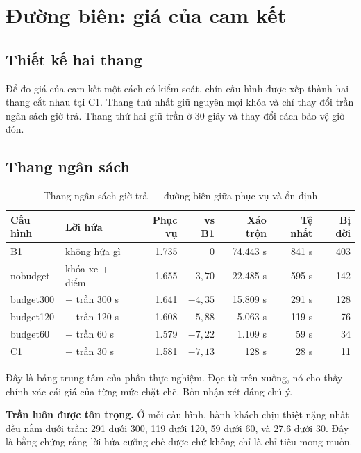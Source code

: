 \section{Đường biên: giá của cam kết}
\label{muc:duongbien}

\subsection{Thiết kế hai thang}

Để đo giá của cam kết một cách có kiểm soát, chín cấu hình được xếp thành hai thang cắt nhau
tại C1. Thang thứ nhất giữ nguyên mọi khóa và chỉ thay đổi trần ngân sách giờ trả. Thang thứ
hai giữ trần ở 30 giây và thay đổi cách bảo vệ giờ đón.

\subsection{Thang ngân sách}

\begin{table}[htbp]
\centering
\caption{Thang ngân sách giờ trả --- đường biên giữa phục vụ và ổn định}
\label{bang:thang1}
\small
\begin{tabular}{@{}llrrrrr@{}}
\toprule
\textbf{Cấu hình} & \textbf{Lời hứa} & \textbf{Phục vụ} & \textbf{vs B1} & \textbf{Xáo trộn} & \textbf{Tệ nhất} & \textbf{Bị dời}\\
\midrule
B1 & không hứa gì & 1.735 & 0 & 74.443 s & 841 s & 403\\
nobudget & khóa xe + điểm & 1.655 & $-3{,}70$ & 22.485 s & 595 s & 142\\
budget300 & $+$ trần 300 s & 1.641 & $-4{,}35$ & 15.809 s & 291 s & 128\\
budget120 & $+$ trần 120 s & 1.608 & $-5{,}88$ & 5.063 s & 119 s & 76\\
budget60 & $+$ trần 60 s & 1.579 & $-7{,}22$ & 1.109 s & 59 s & 34\\
C1 & $+$ trần 30 s & 1.581 & $-7{,}13$ & 128 s & 28 s & 11\\
\bottomrule
\end{tabular}
\end{table}

Đây là bảng trung tâm của phần thực nghiệm. Đọc từ trên xuống, nó cho thấy chính xác cái giá của từng
mức chặt chẽ. Bốn nhận xét đáng chú ý.

\textbf{Trần luôn được tôn trọng.} Ở mỗi cấu hình, hành khách chịu thiệt nặng nhất đều nằm dưới
trần: 291 dưới 300, 119 dưới 120, 59 dưới 60, và 27{,}6 dưới 30. Đây là bằng chứng rằng lời hứa
cưỡng chế được chứ không chỉ là chỉ tiêu mong muốn.

